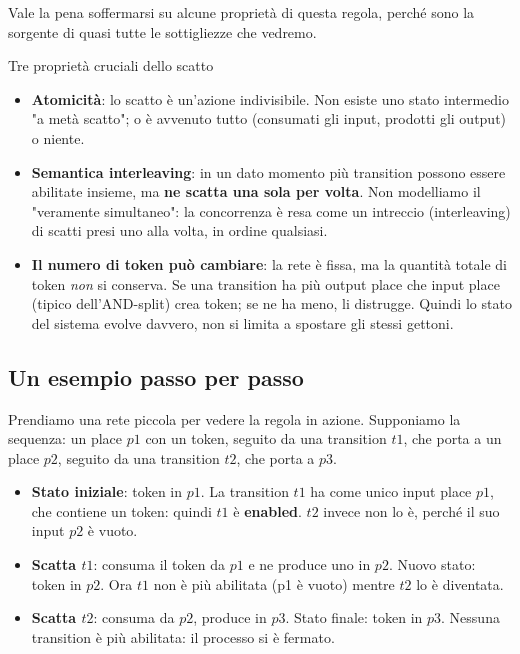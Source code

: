 Vale la pena soffermarsi su alcune proprietà di questa regola, perché sono la sorgente di quasi tutte le sottigliezze che vedremo.

\begin{boxnote}{Tre proprietà cruciali dello scatto}
\begin{itemize}
\item \textbf{Atomicità}: lo scatto è un'azione indivisibile. Non esiste uno stato intermedio "a metà scatto"; o è avvenuto tutto (consumati gli input, prodotti gli output) o niente.
\item \textbf{Semantica interleaving}: in un dato momento più transition possono essere abilitate insieme, ma \textbf{ne scatta una sola per volta}. Non modelliamo il "veramente simultaneo": la concorrenza è resa come un intreccio (interleaving) di scatti presi uno alla volta, in ordine qualsiasi.
\item \textbf{Il numero di token può cambiare}: la rete è fissa, ma la quantità totale di token \emph{non} si conserva. Se una transition ha più output place che input place (tipico dell'AND-split) crea token; se ne ha meno, li distrugge. Quindi lo stato del sistema evolve davvero, non si limita a spostare gli stessi gettoni.
\end{itemize}
\end{boxnote}

\subsection{\texorpdfstring{Un esempio passo per passo}{Un esempio passo per passo}}

Prendiamo una rete piccola per vedere la regola in azione. Supponiamo la sequenza: un place $p1$ con un token, seguito da una transition $t1$, che porta a un place $p2$, seguito da una transition $t2$, che porta a $p3$.

\begin{itemize}
\item \textbf{Stato iniziale}: token in $p1$. La transition $t1$ ha come unico input place $p1$, che contiene un token: quindi $t1$ è \textbf{enabled}. $t2$ invece non lo è, perché il suo input $p2$ è vuoto.
\item \textbf{Scatta $t1$}: consuma il token da $p1$ e ne produce uno in $p2$. Nuovo stato: token in $p2$. Ora $t1$ non è più abilitata (p1 è vuoto) mentre $t2$ lo è diventata.
\item \textbf{Scatta $t2$}: consuma da $p2$, produce in $p3$. Stato finale: token in $p3$. Nessuna transition è più abilitata: il processo si è fermato.
\end{itemize}

